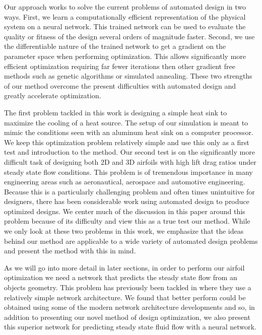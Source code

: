 \documentclass{article} %
\begin{document}
Our approach works to solve the current problems of automated design in two ways. First, we learn a computationally efficient representation of the physical system on a neural network. This trained network can be used to evaluate the quality or fitness of the design several orders of magnitude faster. Second, we use the differentiable nature of the trained network to get a gradient on the parameter space when performing optimization. This allows significantly more efficient optimization requiring far fewer iterations then other gradient free methods such as genetic algorithms or simulated annealing. These two strengths of our method overcome the present difficulties with automated design and greatly accelerate optimization.

The first problem tackled in this work is designing a simple heat sink to maximize the cooling of a heat source. The setup of our simulation is meant to mimic the conditions seen with an aluminum heat sink on a computer processor. We keep this optimization problem relatively simple and use this only as a first test and introduction to the method. Our second test is on the significantly more difficult task of designing both 2D and 3D airfoils with high lift drag ratios under steady state flow conditions. This problem is of tremendous importance in many engineering areas such as aeronautical, aerospace and automotive engineering. Because this is a particularly challenging problem and often times unintuitive for designers, there has been considerable work using automated design to produce optimized designs. We center much of the discussion in this paper around this problem because of its difficulty and view this as a true test our method. While we only look at these two problems in this work, we emphasize that the ideas behind our method are applicable to a wide variety of automated design problems and present the method with this in mind.

As we will go into more detail in later sections, in order to perform our airfoil optimization we need a network that predicts the steady state flow from an objects geometry. This problem has previously been tackled in \citep{guo2016convolutional} where they use a relatively simple network architecture. We found that better perform could be obtained using some of the modern network architecture developments and so, in addition to presenting our novel method of design optimization, we also present this superior network for predicting steady state fluid flow with a neural network.

\end{document}
